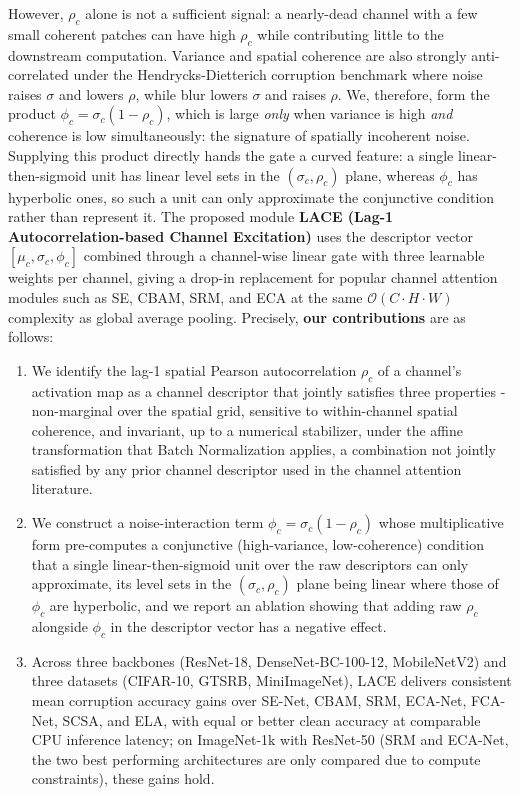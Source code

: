 \documentclass{bmvc2k}
\begin{document}
However, $\rho_c$ alone is not a sufficient signal: a nearly-dead channel with a few small coherent patches can have high $\rho_c$ while contributing little to the downstream computation. Variance and spatial coherence are also strongly anti-correlated under the Hendrycks-Dietterich corruption benchmark \cite{hendrycks2019benchmarkingneuralnetworkrobustness} where noise raises $\sigma$ and lowers $\rho$, while blur lowers $\sigma$ and raises $\rho$. We, therefore, form the product $\phi_c = \sigma_c(1-\rho_c)$, which is large \emph{only} when variance is high \emph{and} coherence is low simultaneously: the signature of spatially incoherent noise. Supplying this product directly hands the gate a curved feature: a single linear-then-sigmoid unit has linear level sets in the $(\sigma_c, \rho_c)$ plane, whereas $\phi_c$ has hyperbolic ones, so such a unit can only approximate the conjunctive condition rather than represent it. The proposed module \textbf{LACE (Lag-1 Autocorrelation-based Channel Excitation)} uses the descriptor vector $[\mu_c, \sigma_c, \phi_c]$ combined through a channel-wise linear gate with three learnable weights per channel, giving a drop-in replacement for popular channel attention modules such as SE, CBAM, SRM, and ECA at the same $\mathcal{O}(C \cdot H \cdot W)$ complexity as global average pooling. Precisely, \textbf{our contributions} are as follows:
\begin{enumerate}
\item We identify the lag-1 spatial Pearson autocorrelation $\rho_c$ of a channel's activation map as a channel descriptor that jointly satisfies three properties - non-marginal over the spatial grid,
sensitive to within-channel spatial coherence, and invariant, up to a numerical stabilizer, under the affine transformation that Batch Normalization applies, a combination not jointly satisfied by any prior channel descriptor used in the channel attention literature.
\item We construct a noise-interaction term $\phi_c =
\sigma_c(1-\rho_c)$ whose multiplicative form pre-computes a conjunctive (high-variance, low-coherence) condition that a single linear-then-sigmoid unit over the raw descriptors can only approximate, its level sets in the $(\sigma_c,\rho_c)$ plane being linear where those of $\phi_c$ are hyperbolic, and we report an ablation showing that adding raw $\rho_c$ alongside $\phi_c$ in the descriptor vector has a negative effect.
\item Across three backbones (ResNet-18, DenseNet-BC-100-12, MobileNetV2) and three datasets (CIFAR-10, GTSRB, MiniImageNet), LACE delivers consistent mean corruption accuracy gains over SE-Net, CBAM, SRM, ECA-Net, FCA-Net, SCSA, and ELA, with equal or better clean accuracy at comparable CPU inference latency; on ImageNet-1k with ResNet-50 (SRM and ECA-Net, the two best performing architectures are only compared due to compute constraints), these gains hold.
\end{enumerate}
\end{document}
